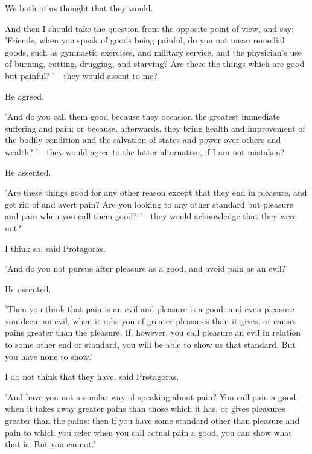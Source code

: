 \documentclass[11pt,letter]{article}
\begin{document}
\par  We both of us thought that they would.

\par  And then I should take the question from the opposite point of view, and say: 'Friends, when you speak of goods being painful, do you not mean remedial goods, such as gymnastic exercises, and military service, and the physician's use of burning, cutting, drugging, and starving? Are these the things which are good but painful? '—they would assent to me?

\par  He agreed.

\par  'And do you call them good because they occasion the greatest immediate suffering and pain; or because, afterwards, they bring health and improvement of the bodily condition and the salvation of states and power over others and wealth? '—they would agree to the latter alternative, if I am not mistaken?

\par  He assented.

\par  'Are these things good for any other reason except that they end in pleasure, and get rid of and avert pain? Are you looking to any other standard but pleasure and pain when you call them good? '—they would acknowledge that they were not?

\par  I think so, said Protagoras.

\par  'And do you not pursue after pleasure as a good, and avoid pain as an evil?'

\par  He assented.

\par  'Then you think that pain is an evil and pleasure is a good: and even pleasure you deem an evil, when it robs you of greater pleasures than it gives, or causes pains greater than the pleasure. If, however, you call pleasure an evil in relation to some other end or standard, you will be able to show us that standard. But you have none to show.'

\par  I do not think that they have, said Protagoras.

\par  'And have you not a similar way of speaking about pain? You call pain a good when it takes away greater pains than those which it has, or gives pleasures greater than the pains: then if you have some standard other than pleasure and pain to which you refer when you call actual pain a good, you can show what that is. But you cannot.'
\end{document}
